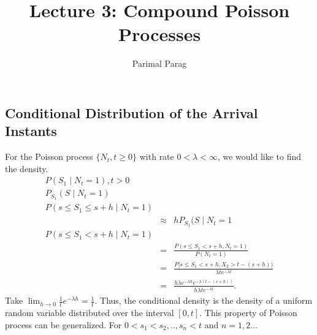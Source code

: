 \documentclass[a4paper,10pt]{article}
\date{}
\title{Lecture 3:  Compound Poisson Processes}
\author{Parimal Parag}
\theoremstyle{plain}
\theoremstyle{definition}
\theoremstyle{remark}
\begin{document}
\maketitle

\subsection{Conditional Distribution of the Arrival Instants}
\noindent For the Poisson process $\{N_{t}, t\geq 0\}$ with rate $0<\lambda< \infty$, we would like to find the density.
\begin{eqnarray*}
  P(S_{1}\mid N_{t}=1), t>0 \\
  P_{S_1}(S \mid N_{t}=1) \\
  P(s\leq S_{1} \leq s+h \mid N_{t}=1)\\
   &\approx& h P_{S_1}(S \mid N_{t}=1 \\
  P(s\leq S_{1}< s+h \mid N_{t}=1)\\
   &=& \frac{P(s\leq S_{1}< s+h,N_{t}=1)}{P(N_{t}=1)}\\
   &=& \frac{P[s\leq S_{1}<s+h,X_{2}>t-(s+h))}{\lambda t e^{-\lambda t}} \\
   &=& \frac{h \lambda e^{-\lambda h} e^{-\lambda (t-(s+h))}}{h{\lambda t} e^{-\lambda t}}.
   \end{eqnarray*}
   Take  $\lim _{h\rightarrow 0}\frac{1}{t}{e^{-\lambda h}} =\frac{1}{t}.$ Thus, the conditional density is the density of a uniform random variable distributed over the interval $[0,t].$ This property of Poisson process can be generalized. For $0<s_{1}<s_{2},.., s_{n}<t$ and $n=1,2 \hdots$ \\
\end{document}
